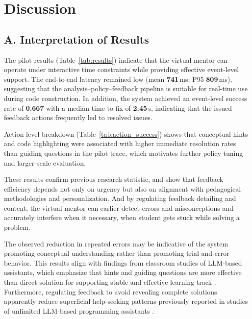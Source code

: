 \documentclass[conference]{IEEEtran}
\begin{document}
\section{Discussion}

\subsection*{A. Interpretation of Results}

The pilot results (Table~\ref{tab:results}) indicate that the virtual mentor can operate under
interactive time constraints while providing effective event-level support.
The end-to-end latency remained low (mean \textbf{741}\,ms; P95 \textbf{809}\,ms), suggesting that the
analysis--policy--feedback pipeline is suitable for real-time use during code construction.
In addition, the system achieved an event-level success rate of \textbf{0.667} with a median time-to-fix
of \textbf{2.45}\,s, indicating that the issued feedback actions frequently led to resolved issues.

Action-level breakdown (Table~\ref{tab:action_success}) shows that conceptual hints and code highlighting
were associated with higher immediate resolution rates than guiding questions in the pilot trace,
which motivates further policy tuning and larger-scale evaluation.


These results confirm previous research statistic, and show that feedback efficiency depends not only on urgency but also on alignment with pedagogical methodologies and personalization\cite{SystematicLiteratureReviewonLLM,DesirableCharacteristicsforAITeachingAssistantsinProgrammingEducation}. And by regulating feedback detailing and content, the virtual mentor can earlier detect errors and misconceptions and accurately interfere when it necessary, when student gets stuck while solving a problem.

The observed reduction in repeated errors may be indicative of the system promoting conceptual understanding rather than promoting trial-and-error behavior. This results align with findings from classroom studies of LLM-based assistants, which emphasize that hints and guiding questions are more effective than direct solution for supporting stable and effective learning track \cite{IRIS,CodeAid}.  Furthermore, regulating feedback to avoid revealing complete solutions apparently reduce superficial help-seeking patterns previously reported in studies of unlimited LLM-based programming assistants \cite{PatternsofLLMPoweredProgrammingAssistant}.
\end{document}
